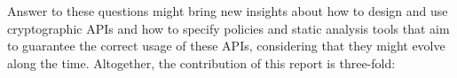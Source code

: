 \documentclass{article}
\begin{document}
Answer to these questions might bring new insights about how to design and use cryptographic APIs and how to specify policies and static analysis tools that aim
to guarantee the correct usage of these APIs, considering that they
might evolve along the time. Altogether, the contribution of
this report is three-fold:



\end{document}
